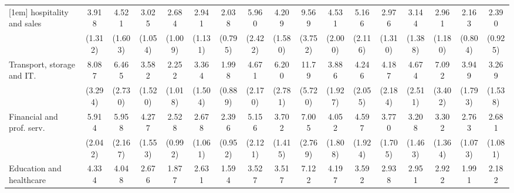 {\begin{tabular}{l*{16}{c}}
[1em]
hospitality and sales&       3.918\sym{***}&       4.521\sym{***}&       3.025\sym{**} &       2.684\sym{**} &       2.941\sym{**} &       2.038         &       5.960\sym{***}&       4.209\sym{***}&       9.569\sym{***}&       4.531\sym{***}&       5.166\sym{***}&       2.976\sym{*}  &       3.144\sym{**} &       2.961\sym{**} &       2.163\sym{*}  &       2.390\sym{*}  \\
                    &     (1.312)         &     (1.603)         &     (1.054)         &     (1.009)         &     (1.131)         &     (0.795)         &     (2.422)         &     (1.580)         &     (3.752)         &     (2.000)         &     (2.116)         &     (1.310)         &     (1.388)         &     (1.180)         &     (0.804)         &     (0.925)         \\
[1em]
Transport, storage and IT.&       8.087\sym{***}&       6.465\sym{***}&       3.582\sym{**} &       2.252         &       3.364\sym{**} &       1.998         &       4.671\sym{***}&       6.200\sym{***}&       11.79\sym{***}&       3.886\sym{**} &       4.246\sym{**} &       4.187\sym{**} &       4.674\sym{**} &       7.092\sym{***}&       3.949\sym{**} &       3.269\sym{*}  \\
                    &     (3.294)         &     (2.730)         &     (1.520)         &     (1.018)         &     (1.504)         &     (0.889)         &     (2.170)         &     (2.781)         &     (5.720)         &     (1.927)         &     (2.055)         &     (2.184)         &     (2.511)         &     (3.402)         &     (1.793)         &     (1.538)         \\
[1em]
Financial and prof. serv.&       5.914\sym{***}&       5.958\sym{***}&       4.277\sym{***}&       2.528\sym{*}  &       2.678\sym{*}  &       2.396\sym{*}  &       5.156\sym{***}&       3.702\sym{***}&       7.005\sym{***}&       4.052\sym{**} &       4.597\sym{***}&       3.770\sym{**} &       3.208\sym{*}  &       3.302\sym{**} &       2.763\sym{**} &       2.681\sym{*}  \\
                    &     (2.042)         &     (2.167)         &     (1.553)         &     (0.992)         &     (1.061)         &     (0.952)         &     (2.121)         &     (1.415)         &     (2.769)         &     (1.808)         &     (1.924)         &     (1.705)         &     (1.463)         &     (1.364)         &     (1.073)         &     (1.081)         \\
[1em]
Education and healthcare&       4.334\sym{***}&       4.048\sym{***}&       2.676\sym{**} &       1.877         &       2.631\sym{*}  &       1.594         &       3.527\sym{**} &       3.517\sym{**} &       7.122\sym{***}&       4.197\sym{**} &       3.592\sym{**} &       2.938\sym{*}  &       2.951\sym{*}  &       2.922\sym{**} &       1.991         &       2.182         \\

\end{tabular}}
